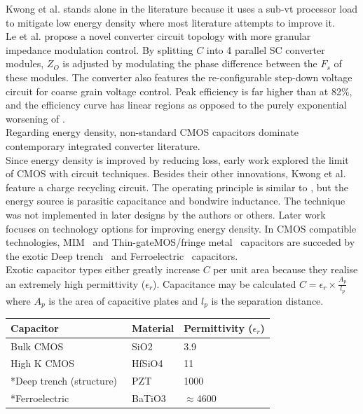 \documentclass[letterpaper,twocolumn,10pt]{article}
\begin{document}
Kwong et al. stands alone in the literature because it uses a sub-vt processor load to mitigate low energy density where most literature attempts to improve it.\\
\indent Le et al. \cite{Phuck2010} propose a novel converter circuit topology with more granular impedance modulation control. By splitting $C$ into 4 parallel SC converter modules, $Z_O$ is adjusted by modulating the phase difference between the $F_s$ of these modules. The converter also features the re-configurable step-down voltage circuit for coarse grain voltage control. Peak efficiency is far higher than \cite{Viraj2007} at 82\%, and the efficiency curve has linear regions as opposed to the purely exponential worsening of \cite{Viraj2007}.\\
\indent Regarding energy density, non-standard CMOS capacitors dominate contemporary integrated converter literature.\\
Since energy density is improved by reducing loss, early work explored the limit of CMOS with circuit techniques. Besides their other innovations, Kwong et al.\cite{Kwong2009} feature a charge recycling circuit. The operating principle is similar to \cite{Alimadadi2008}, but the energy source is parasitic capacitance and bondwire inductance. The technique was not implemented in later designs by the authors or others.
\indent Later work focuses on technology options for improving energy density. In CMOS compatible technologies, MIM~\cite{Kwong2009} and Thin-gateMOS/fringe metal~\cite{Pique2012} capacitors are succeded by the exotic Deep trench~\cite{Pique} and Ferroelectric~\cite{Damak2013} capacitors.\\
Exotic capacitor types either greatly increase $C$ per unit area because they realise an extremely high permittivity ($\epsilon_r$). Capacitance may be calculated $C = \epsilon_r \times \frac{A_p}{l_p}$ where $A_p$ is the area of capacitive plates and $l_p$ is the separation distance. 
\begin{table}
    \begin{tabular}{|l|l|l|}
    \hline
    Capacitor               & Material & Permittivity ($\epsilon_r$) \\ \hline
    Bulk CMOS~\cite{Robertson2004}               & SiO2     & 3.9          \\ \hline
    High K CMOS~\cite{Robertson2004}             & HfSiO4   & 11           \\ \hline
    *Deep trench (structure)~\cite{Johari2009} & PZT      & 1000         \\ \hline
    *Ferroelectric~\cite{Lee2004}			& BaTiO3      & $\approx$4600         \\ \hline    
    \end{tabular}
\end{table}
\end{document}
